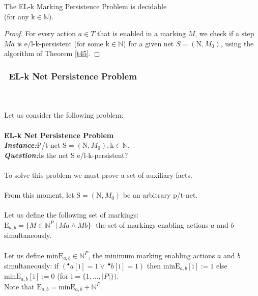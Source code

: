 \documentclass[a4paper]{llncs}
\begin{document}
\begin{theorem}
\label{t46}
The EL-k Marking Persistence Problem is decidable \\
\indent\indent\indent (for any $\mathrm{k} \in \mathbb{N})$.
\end{theorem}

\begin{proof}
For every action $a\in T$ that is enabled in a marking $M$, we check if a step $Ma$ is e/l-k-persistent (for some $\mathrm{k} \in \mathbb{N}$) for a given net $S=(\mathrm{N}, M_0)$, using the algorithm of Theorem \ref{t45}. 	
\end{proof}



\subsubsection{\textbullet \ EL-k Net Persistence Problem}\mbox{ }\\ 
\\
Let us consider the following problem:
\\ \\
\textbf{EL-k Net Persistence Problem}
\\
\indent\textbf{\emph{Instance:}}P/t-net $\mathrm{S}=(\mathrm{N}, M_0),\mathrm{k}\in\mathbb{N}$.\\
\indent\textbf{\emph{Question:}}Is the net S e/l-k-persistent?
\\
\\To solve this problem we must prove a set of auxiliary facts.
\\ \\
From this moment, let $\mathrm{S}=(\mathrm{N}, M_0)$ be an arbitrary p/t-net.
\\ \\
Let us define the following set of markings:\\
$\mathrm{E}_{a,b}=\{M \in \mathbb{N}^{P} \ | \  Ma\land Mb\}$- the set of markings enabling actions $a$ and $b$ simultaneously. \\ 
\\
Let us define $\mathrm{minE}_{a,b} \in \mathbb{N}^{P}$, the minimum marking enabling actions $a$ and $b$ simultaneously: if $(^\bullet a[\mathrm{i}]=1 \lor \ ^\bullet b[\mathrm{i}]=1)$ then $\mathrm{minE}_{a,b}[\mathrm{i}]:=1$ else $\mathrm{minE}_{a,b}[\mathrm{i}]:=0$ (for $\mathrm{i}=\{1,\ldots,|P|\})$.\\
Note that $\mathrm{E}_{a,b}=\mathrm{minE}_{a,b}+ \mathbb{N}^{P}$.
\end{document}
